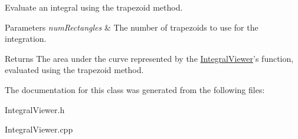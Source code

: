 Evaluate an integral using the trapezoid method. 


\begin{DoxyParams}{Parameters}
{\em num\-Rectangles} & The number of trapezoids to use for the integration. \\
\hline
\end{DoxyParams}
\begin{DoxyReturn}{Returns}
The area under the curve represented by the \hyperlink{classtsgl_1_1_integral_viewer}{Integral\-Viewer}'s function, evaluated using the trapezoid method. 
\end{DoxyReturn}


The documentation for this class was generated from the following files\-:\begin{DoxyCompactItemize}
\item 
Integral\-Viewer.\-h\item 
Integral\-Viewer.\-cpp\end{DoxyCompactItemize}
